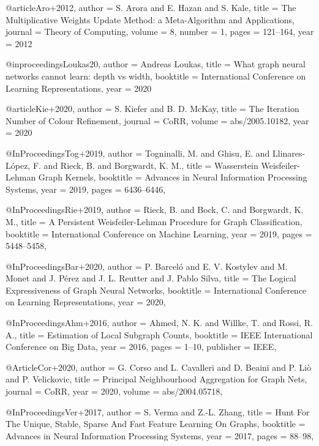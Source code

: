 

@article{Aro+2012,
	author    = {S. Arora and
		E. Hazan and
		S. Kale},
	title     = {The Multiplicative Weights Update Method: a Meta-Algorithm and Applications},
	journal   = {Theory of Computing},
	volume    = {8},
	number    = {1},
	pages     = {121--164},
	year      = {2012}
}


@inproceedings{Loukas20,
	author    = {Andreas Loukas},
	title     = {What graph neural networks cannot learn: depth vs width},
	booktitle = {International Conference on Learning Representations},
	year      = {2020}
}

@article{Kie+2020,
	author    = {S. Kiefer and
	B. D. McKay},
	title     = {The Iteration Number of Colour Refinement},
	journal   = {CoRR},
	volume    = {abs/2005.10182},
	year      = {2020}
}


@InProceedings{Tog+2019,
  author    = {Togninalli, M. and Ghisu, E. and Llinares{-}L{\'{o}}pez, F. and Rieck, B. and Borgwardt, K. M.},
  title     = {Wasserstein {Weisfeiler-Lehman} Graph Kernels},
  booktitle = {Advances in Neural Information Processing Systems},
  year      = {2019},
  pages     = {6436--6446},
}



@InProceedings{Rie+2019,
  author    = {Rieck, B. and Bock, C. and Borgwardt, K. M.},
  title     = {A Persistent {Weisfeiler-Lehman} Procedure for Graph Classification},
  booktitle = {International Conference on Machine Learning},
  year      = {2019},
  pages     = {5448--5458},
}

@InProceedings{Bar+2020,
  author    = {P. Barcel{\'{o}} and E. V. Kostylev and M. Monet and J. P{\'{e}}rez and J. L. Reutter and J. Pablo Silva},
  title     = {The Logical Expressiveness of Graph Neural Networks},
  booktitle = {International Conference on Learning Representations},
  year      = {2020},
}

@InProceedings{Ahm+2016,
  author    = {Ahmed, N. K. and Willke, T. and Rossi, R. A.},
  title     = {Estimation of Local Subgraph Counts},
  booktitle = {IEEE International Conference on Big Data},
  year      = {2016},
  pages     = {1--10},
  publisher = {IEEE},
}

@Article{Cor+2020,
  author  = {G. Corso and L. Cavalleri and D. Beaini and P. Li{\`{o}} and P. Velickovic},
  title   = {Principal Neighbourhood Aggregation for Graph Nets},
  journal = {CoRR},
  year    = {2020},
  volume  = {abs/2004.05718},
}

@InProceedings{Ver+2017,
  author    = {S. Verma and Z.{-}L. Zhang},
  title     = {Hunt For The Unique, Stable, Sparse And Fast Feature Learning On Graphs},
  booktitle = {Advances in Neural Information Processing Systems},
  year      = {2017},
  pages     = {88--98},
}

